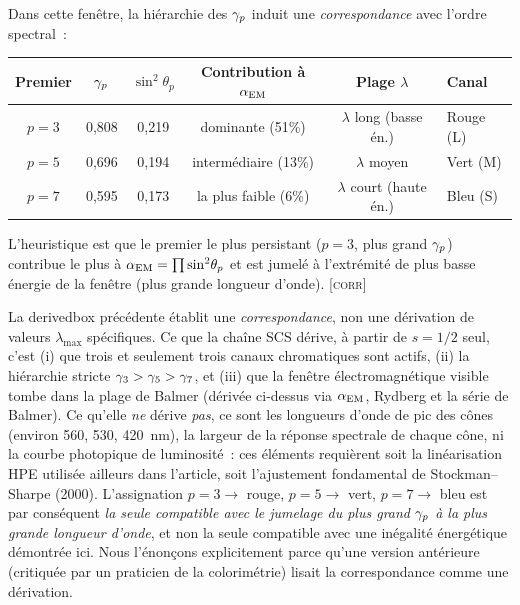 \documentclass[12pt,a4paper]{article}
\begin{document}
\begin{derivedbox}
Dans cette fen\^etre, la hi\'erarchie des $\gamma_{p}$ induit une
\emph{correspondance} avec l'ordre spectral~:
\begin{center}
\begin{tabular}{cccccl}
\toprule
Premier & $\gamma_{p}$ & $\sin^2\!\theta_p$ & Contribution \`a $\alpha_{\mathrm{EM}}$ & Plage $\lambda$ & Canal \\
\midrule
$p = 3$ & 0{,}808 & 0{,}219 & dominante (51\%) & $\lambda$ long (basse \'en.) & Rouge (L) \\
$p = 5$ & 0{,}696 & 0{,}194 & interm\'ediaire (13\%) & $\lambda$ moyen & Vert (M) \\
$p = 7$ & 0{,}595 & 0{,}173 & la plus faible (6\%) & $\lambda$ court (haute \'en.) & Bleu (S) \\
\bottomrule
\end{tabular}
\end{center}

L'heuristique est que le premier le plus persistant ($p = 3$, plus
grand $\gamma_{p}$) contribue le plus \`a
$\alpha_{\mathrm{EM}} = \prod \sin^2\!\theta_p$ et est jumel\'e \`a l'extr\'emit\'e
de plus basse \'energie de la fen\^etre (plus grande longueur d'onde).
\textsc{[corr]}
\end{derivedbox}

\begin{remark}
La derivedbox pr\'ec\'edente \'etablit une \emph{correspondance}, non
une d\'erivation de valeurs $\lambda_{\max}$ sp\'ecifiques. Ce que
la cha\^ine SCS d\'erive, \`a partir de $s = 1/2$ seul, c'est (i) que
trois et seulement trois canaux chromatiques sont actifs, (ii) la
hi\'erarchie stricte $\gamma_{3} > \gamma_{5} > \gamma_{7}$, et (iii) que
la fen\^etre \'electromagn\'etique visible tombe dans la plage de
Balmer (d\'eriv\'ee ci-dessus via $\alpha_{\mathrm{EM}}$, Rydberg et la s\'erie de
Balmer). Ce qu'elle \emph{ne} d\'erive \emph{pas}, ce sont les
longueurs d'onde de pic des c\^ones (environ 560, 530, 420~nm), la
largeur de la r\'eponse spectrale de chaque c\^one, ni la courbe
photopique de luminosit\'e~: ces \'el\'ements requi\`erent soit la
lin\'earisation HPE utilis\'ee ailleurs dans l'article, soit
l'ajustement fondamental de Stockman--Sharpe (2000). L'assignation
$p = 3 \to$ rouge, $p = 5 \to$ vert, $p = 7 \to$ bleu est par
cons\'equent \emph{la seule compatible avec le jumelage du plus grand
$\gamma_{p}$ \`a la plus grande longueur d'onde}, et non la seule
compatible avec une in\'egalit\'e \'energ\'etique d\'emontr\'ee ici.
Nous l'\'enon\c{c}ons explicitement parce qu'une version ant\'erieure
(critiqu\'ee par un praticien de la colorim\'etrie) lisait la
correspondance comme une d\'erivation.
\end{remark}
\end{document}

